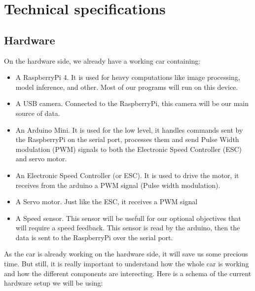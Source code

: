 \documentclass[12pt]{article}
\begin{document}
\newpage

\section{Technical specifications}

\subsection{Hardware}
On the hardware side, we already have a working car containing:
\begin{itemize}
\item A RaspberryPi 4. It is used for heavy computations like image processing, model inference, and other. Most of our programs will run on this device.
\item A USB camera. Connected to the RaspberryPi, this camera will be our main source of data.
\item An Arduino Mini. It is used for the low level, it handles commands sent by the RaspberryPi on the serial port, processes them and send Pulse Width modulation (PWM) signals to both the Electronic Speed Controller (ESC) and servo motor.
\item An Electronic Speed Controller (or ESC). It is used to drive the motor, it receives  from the arduino a PWM signal (Pulse width modulation).
\item A Servo motor. Just like the ESC, it receives a PWM signal
\item A Speed sensor. This sensor will be usefull for our optional objectives that will require a speed feedback. This sensor is read by the arduino, then the data is sent to the RaspberryPi over the serial port.
\end{itemize}

As the car is already working on the hardware side, it will save us some precious time. But still, it is really important to understand how the whole car is working and how the different components are interecting.
Here is a schema of the current hardware setup we will be using:
\newpage

\end{document}
